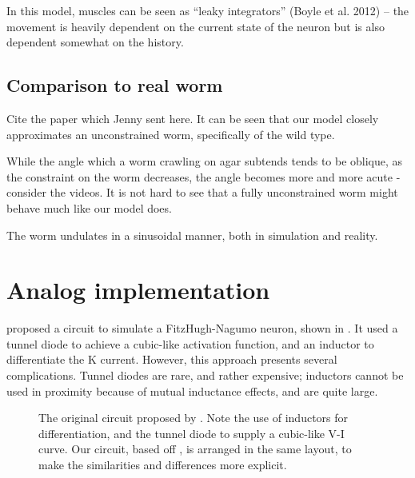 \documentclass[
    11pt,
]{article}
\begin{document}
In this model, muscles can be seen as “leaky integrators” (Boyle et al. 2012) – the movement is heavily dependent on the current state of the neuron but is also dependent somewhat on the history.

\subsection{Comparison to real worm}

Cite the paper which Jenny sent here.  It can be seen that our model closely approximates an unconstrained worm, specifically of the wild type.

While the angle which a worm crawling on agar subtends tends to be oblique, as the constraint on the worm decreases, the angle becomes more and more acute - consider the videos.  It is not hard to see that a fully unconstrained worm might behave much like our model does.

The worm undulates in a sinusoidal manner, both in simulation and reality.


\section{Analog implementation}

\citet{nagumo1962} proposed a circuit to simulate a FitzHugh-Nagumo neuron, shown in .  It used a tunnel diode to achieve a cubic-like activation function, and an inductor to differentiate the K current.  However, this approach presents several complications.  Tunnel diodes are rare, and rather expensive; inductors cannot be used in proximity because of mutual inductance effects, and are quite large.

\begin{figure}[h!]
    \centering
    \caption{The original circuit proposed by \citet{nagumo1962}.  Note the use of inductors for differentiation, and the tunnel diode to supply a cubic-like V-I curve.  Our circuit, based off \citet{keener1983}, is arranged in the same layout, to make the similarities and differences more explicit.}
    \label{fig: nagumo_ckt}
\end{figure}

\end{document}
